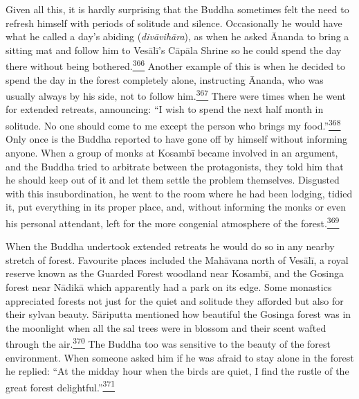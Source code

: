 Given all this, it is hardly surprising that the Buddha sometimes felt
the need to refresh himself with periods of solitude and silence.
Occasionally he would have what he called a day's abiding
(\emph{divāvihāra}), as when he asked Ānanda to bring a sitting mat and
follow him to Vesālī's Cāpāla Shrine so he could spend the day there
without being
bothered.\label{footprints_split_011.html_fnref366}\hyperref[footprints_split_024.htmlux5cux23fn366]{\textsuperscript{366}}
Another example of this is when he decided to spend the day in the
forest completely alone, instructing Ānanda, who was usually always by
his side, not to follow
him.\label{footprints_split_011.html_fnref367}\hyperref[footprints_split_024.htmlux5cux23fn367]{\textsuperscript{367}}
There were times when he went for extended retreats, announcing: ``I
wish to spend the next half month in solitude. No one should come to me
except the person who brings my
food.''\label{footprints_split_011.html_fnref368}\hyperref[footprints_split_024.htmlux5cux23fn368]{\textsuperscript{368}}
Only once is the Buddha reported to have gone off by himself without
informing anyone. When a group of monks at Kosambī became involved in an
argument, and the Buddha tried to arbitrate between the protagonists,
they told him that he should keep out of it and let them settle the
problem themselves. Disgusted with this insubordination, he went to the
room where he had been lodging, tidied it, put everything in its proper
place, and, without informing the monks or even his personal attendant,
left for the more congenial atmosphere of the
forest.\label{footprints_split_011.html_fnref369}\hyperref[footprints_split_024.htmlux5cux23fn369]{\textsuperscript{369}}

When the Buddha undertook extended retreats he would do so in any nearby
stretch of forest. Favourite places included the Mahāvana north of
Vesālī, a royal reserve known as the Guarded Forest woodland near
Kosambī, and the Gosinga forest near Nādikā which apparently had a park
on its edge. Some monastics appreciated forests not just for the quiet
and solitude they afforded but also for their sylvan beauty. Sāriputta
mentioned how beautiful the Gosinga forest was in the moonlight when all
the sal trees were in blossom and their scent wafted through the
air.\label{footprints_split_011.html_fnref370}\hyperref[footprints_split_024.htmlux5cux23fn370]{\textsuperscript{370}}
The Buddha too was sensitive to the beauty of the forest environment.
When someone asked him if he was afraid to stay alone in the forest he
replied: ``At the midday hour when the birds are quiet, I find the
rustle of the great forest
delightful.''\label{footprints_split_011.html_fnref371}\hyperref[footprints_split_024.htmlux5cux23fn371]{\textsuperscript{371}}


